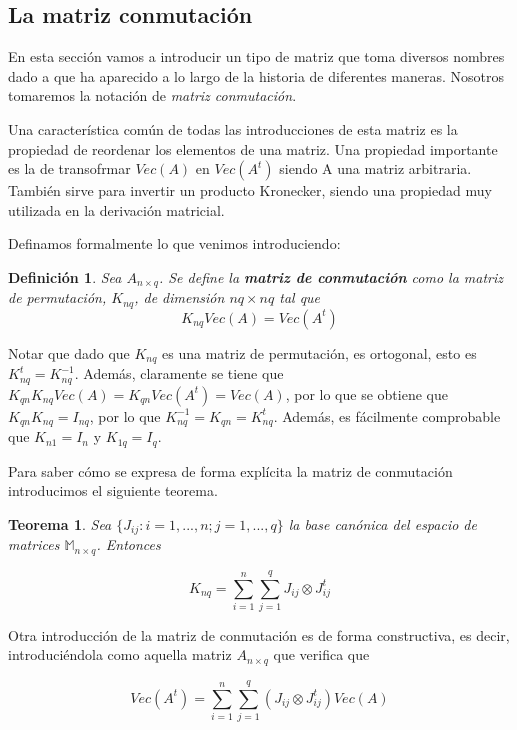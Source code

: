 \documentclass{article}
\theoremstyle{theorem-style}  %
\newtheorem{theorem}{Teorema}[section]  %
\theoremstyle{definition-style}
\newtheorem{definition}{Definición}[section]
\theoremstyle{example-style}
\theoremstyle{exercise-style}
\begin{document}
	\subsection{La matriz conmutación}
	
	En esta sección vamos a introducir un tipo de matriz que toma diversos nombres dado a  que ha aparecido a lo largo de la historia de diferentes maneras. Nosotros tomaremos la notación de \textit{matriz conmutación}. 
	
	Una característica común de todas las introducciones de esta matriz es la propiedad de reordenar los 
	elementos de una matriz. Una propiedad importante es la de transofrmar $Vec(A)$ en $Vec(A^t)$ siendo A una matriz arbitraria. También sirve para invertir un producto Kronecker, siendo una propiedad muy utilizada en la derivación matricial.
	
	Definamos formalmente lo que venimos introduciendo:
	
	\begin{definition}	
		Sea $A_{n \times q}$. Se define la \textbf{matriz de conmutación} como la matriz de permutación, $K_{nq}$, de dimensión $nq \times nq$ tal que $$K_{nq}Vec(A) = Vec(A^t)$$
		
	\end{definition}
	
	
	Notar que dado que $K_{nq}$ es una matriz de permutación, es ortogonal, esto es $K_{nq}^t = K_{nq}^{-1}$. Además, claramente se tiene que $K_{qn}K_{nq} Vec(A) = K_{qn} Vec(A^t) = Vec(A)$, por lo que se obtiene que $K_{qn} K_{nq} = I_{nq}$, por lo que $K_{nq}^{-1} = K_{qn} = K_{nq}^t$. Además, es fácilmente comprobable que $K_{n1} = I_n$ y $K_{1q} = I_q$.
	
	Para saber cómo se expresa de forma explícita la matriz de conmutación introducimos el siguiente teorema.
	
	\begin{theorem}
		\textit{Sea $\{J_{ij}: i = 1, ..., n; j = 1,..., q\}$ la base canónica del espacio de matrices $\mathbb{M}_{n \times q}$. Entonces}
		
		$$K_{nq} = \sum_{i=1}^{n} \sum_{j=1}^{q} J_{ij} \otimes J_{ij}^t$$
	\end{theorem}
	
	Otra introducción de la matriz de conmutación es de forma constructiva, es decir, introduciéndola como aquella matriz $A_{n \times q}$ que verifica que
	
	$$
	Vec(A^t) = \sum_{i=1}^{n} \sum_{j=1}^{q}(J_{ij} \otimes J_{ij}^t) Vec(A)
	$$
	
\end{document}
